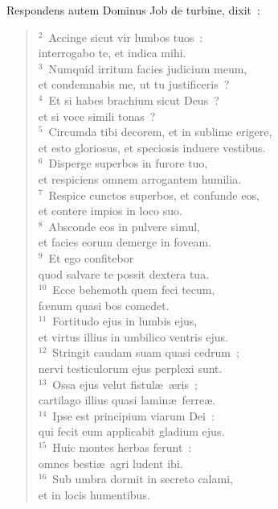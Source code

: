 \lettrine[lines=10,image=true,loversize=0.05,lraise=-0.03]{R}{}espondens autem Dominus Job de turbine, dixit~:
\begin{flushleft}\begin{verse}\vspace{6pt}${}^{2}$~Accinge sicut vir lumbos tuos~:\\ interrogabo te, et indica mihi.\\
${}^{3}$~Numquid irritum facies judicium meum,\\ et condemnabis me, ut tu justificeris~?\\
${}^{4}$~Et si habes brachium sicut Deus~?\\ et si voce simili tonas~?\\
${}^{5}$~Circumda tibi decorem, et in sublime erigere,\\ et esto gloriosus, et speciosis induere vestibus.\\
${}^{6}$~Disperge superbos in furore tuo,\\ et respiciens omnem arrogantem humilia.\\
${}^{7}$~Respice cunctos superbos, et confunde eos,\\ et contere impios in loco suo.\\
${}^{8}$~Absconde eos in pulvere simul,\\ et facies eorum demerge in foveam.\\
${}^{9}$~Et ego confitebor\\ quod salvare te possit dextera tua.\\
${}^{10}$~Ecce behemoth quem feci tecum,\\ fœnum quasi bos comedet.\\
${}^{11}$~Fortitudo ejus in lumbis ejus,\\ et virtus illius in umbilico ventris ejus.\\
${}^{12}$~Stringit caudam suam quasi cedrum~;\\ nervi testiculorum ejus perplexi sunt.\\
${}^{13}$~Ossa ejus velut fistul\ae\ \ae ris~;\\ cartilago illius quasi lamin\ae\ ferre\ae .\\
${}^{14}$~Ipse est principium viarum Dei~:\\ qui fecit eum applicabit gladium ejus.\\
${}^{15}$~Huic montes herbas ferunt~:\\ omnes besti\ae\ agri ludent ibi.\\
${}^{16}$~Sub umbra dormit in secreto calami,\\ et in locis humentibus.\\

\end{verse}
\end{flushleft}
